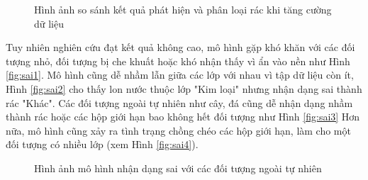 \documentclass[../the.tex]{subfiles}
\begin{document}
\begin{figure}[H]
    \centering
    \qquad
    \qquad
    \caption{Hình ảnh so sánh kết quả phát hiện và phân loại rác khi tăng cường dữ liệu}
    \label{fig:final}
\end{figure}

{\fontsize{13}{12} \selectfont 

Tuy nhiên nghiên cứu đạt kết quả không cao, mô hình gặp khó khăn với các đối tượng nhỏ, đối tượng bị che khuất hoặc khó nhận thấy vì ẩn vào nền như Hình \ref{fig:sai1}.
Mô hình cũng dễ nhầm lẫn giữa các lớp với nhau vì tập dữ liệu còn ít, Hình \ref{fig:sai2} cho thấy lon nước thuộc lớp "Kim loại" nhưng nhận dạng sai thành rác "Khác".
Các đối tượng ngoài tự nhiên như cây, đá cũng dễ nhận dạng nhầm thành rác hoặc các hộp giới hạn bao không hết đối tượng như Hình \ref{fig:sai3}
Hơn nữa, mô hình cũng xảy ra tình trạng chồng chéo các hộp giới hạn, làm cho một đối tượng có nhiều lớp (xem Hình \ref{fig:sai4}).

}


\begin{figure}[H]
    \centering
    \qquad
    \qquad
    \qquad
    \caption{Hình ảnh mô hình nhận dạng sai với các đối tượng ngoài tự nhiên}
    \label{fig:sai}
\end{figure}
\end{document}
